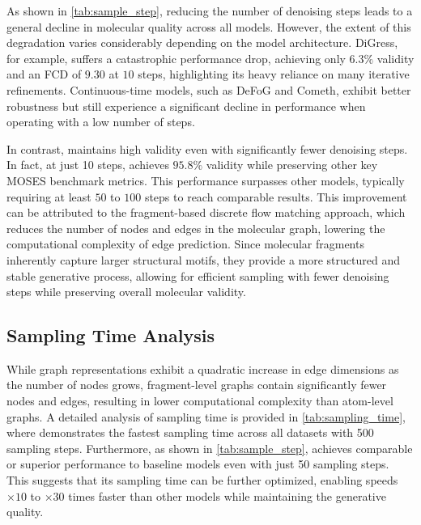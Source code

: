 As shown in \cref{tab:sample_step}, reducing the number of denoising steps leads to a general decline in molecular quality across all models.
However, the extent of this degradation varies considerably depending on the model architecture.
DiGress, for example, suffers a catastrophic performance drop, achieving only $6.3\%$ validity and an FCD of $9.30$ at $10$ steps, highlighting its heavy reliance on many iterative refinements.
Continuous-time models, such as DeFoG and Cometh, exhibit better robustness but still experience a significant decline in performance when operating with a low number of steps.

In contrast, \methodname{} maintains high validity even with significantly fewer denoising steps.
In fact, at just 10 steps, \methodname{} achieves $95.8\%$ validity while preserving other key MOSES benchmark metrics.
This performance surpasses other models, typically requiring at least $50$ to $100$ steps to reach comparable results.
This improvement can be attributed to the fragment-based discrete flow matching approach, which reduces the number of nodes and edges in the molecular graph, lowering the computational complexity of edge prediction.
Since molecular fragments inherently capture larger structural motifs, they provide a more structured and stable generative process, allowing for efficient sampling with fewer denoising steps while preserving overall molecular validity.


\clearpage
\subsection{Sampling Time Analysis}
\label{appsubsec:sampling_time_analysis}



While graph representations exhibit a quadratic increase in edge dimensions as the number of nodes grows, fragment-level graphs contain significantly fewer nodes and edges, resulting in lower computational complexity than atom-level graphs. 
A detailed analysis of sampling time is provided in \cref{tab:sampling_time}, where \methodname{} demonstrates the fastest sampling time across all datasets with 500 sampling steps.
Furthermore, as shown in \cref{tab:sample_step}, \methodname{} achieves comparable or superior performance to baseline models even with just 50 sampling steps. This suggests that its sampling time can be further optimized, enabling speeds $\times10$ to $\times30$ times faster than other models while maintaining the generative quality.


